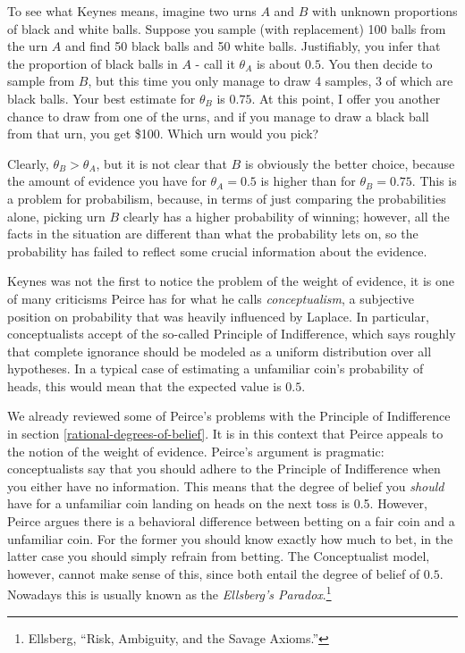 To see what Keynes means, imagine two urns \(A\) and \(B\) with unknown
proportions of black and white balls. Suppose you sample (with
replacement) 100 balls from the urn \(A\) and find 50 black balls and 50
white balls. Justifiably, you infer that the proportion of black balls
in \(A\) - call it \(\theta_A\) is about \(0.5\). You then decide to
sample from \(B\), but this time you only manage to draw 4 samples, 3 of
which are black balls. Your best estimate for \(\theta_B\) is \(0.75\).
At this point, I offer you another chance to draw from one of the urns,
and if you manage to draw a black ball from that urn, you get \$100.
Which urn would you pick?

Clearly, \(\theta_B > \theta_A\), but it is not clear that \(B\) is
obviously the better choice, because the amount of evidence you have for
\(\theta_A = 0.5\) is higher than for \(\theta_B = 0.75\). This is a
problem for probabilism, because, in terms of just comparing the
probabilities alone, picking urn \(B\) clearly has a higher probability
of winning; however, all the facts in the situation are different than
what the probability lets on, so the probability has failed to reflect
some crucial information about the evidence.

Keynes was not the first to notice the problem of the weight of
evidence, it is one of many criticisms Peirce has for what he calls
\emph{conceptualism}, a subjective position on probability that was
heavily influenced by Laplace. In particular, conceptualists accept of
the so-called Principle of Indifference, which says roughly that
complete ignorance should be modeled as a uniform distribution over all
hypotheses. In a typical case of estimating a unfamiliar coin's
probability of heads, this would mean that the expected value is
\(0.5\).

We already reviewed some of Peirce's problems with the Principle of Indifference in section \ref{rational-degrees-of-belief}. It is in this context that
Peirce appeals to the notion of the weight of evidence. Peirce's argument is pragmatic: conceptualists say that you should
adhere to the Principle of Indifference when you either have no
information. This means that the degree of belief you \emph{should} have
for a unfamiliar coin landing on heads on the next toss is 0.5. However,
Peirce argues there is a behavioral difference between betting on a fair
coin and a unfamiliar coin. For the former you should know exactly how
much to bet, in the latter case you should simply refrain from betting.
The Conceptualist model, however, cannot make sense of this, since both
entail the degree of belief of \(0.5\). Nowadays this is usually known
as the \emph{Ellsberg's Paradox}.\footnote{Ellsberg, ``Risk, Ambiguity,
  and the Savage Axioms.''}


